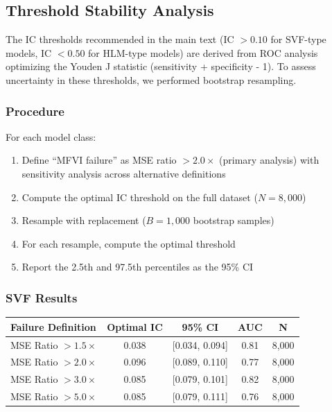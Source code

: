 \documentclass[10pt]{article} %
\theoremstyle{plain}
\theoremstyle{definition}
\begin{document}
\subsection{Threshold Stability Analysis}
\label{sec:threshold_stability}

The IC thresholds recommended in the main text (IC $> 0.10$ for SVF-type models, IC $< 0.50$ for HLM-type models) are derived from ROC analysis optimizing the Youden J statistic (sensitivity + specificity - 1). To assess uncertainty in these thresholds, we performed bootstrap resampling.

\subsubsection{Procedure}

For each model class:
\begin{enumerate}
\item Define ``MFVI failure'' as MSE ratio $> 2.0\times$ (primary analysis) with sensitivity analysis across alternative definitions
\item Compute the optimal IC threshold on the full dataset ($N = 8{,}000$)
\item Resample with replacement ($B = 1{,}000$ bootstrap samples)
\item For each resample, compute the optimal threshold
\item Report the 2.5th and 97.5th percentiles as the 95\% CI
\end{enumerate}

\subsubsection{SVF Results}

\begin{center}
\begin{tabular}{lcccc}
\toprule
Failure Definition & Optimal IC & 95\% CI & AUC & N \\
\midrule
MSE Ratio $> 1.5\times$ & 0.038 & [0.034, 0.094] & 0.81 & 8,000 \\
MSE Ratio $> 2.0\times$ & 0.096 & [0.089, 0.110] & 0.77 & 8,000 \\
MSE Ratio $> 3.0\times$ & 0.085 & [0.079, 0.101] & 0.82 & 8,000 \\
MSE Ratio $> 5.0\times$ & 0.085 & [0.079, 0.111] & 0.76 & 8,000 \\
\bottomrule
\end{tabular}
\end{center}
\end{document}
